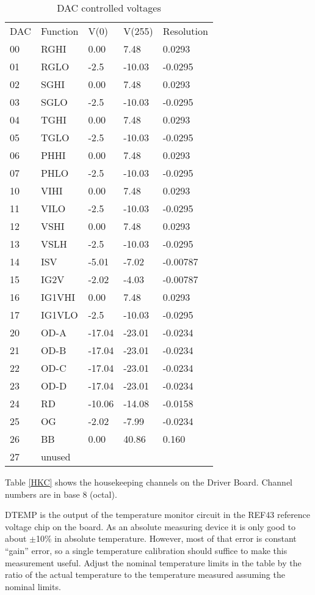 \documentclass[a4paper,12pt]{article}
\begin{document}
\begin{table}[h]
\centering
\begin{tabular}{|l|l|l|l|l|}
\hline
DAC & Function & V(0) & V(255) & Resolution \\
00 & RGHI & 0.00 & 7.48 & 0.0293 \\
01 & RGLO & -2.5 & -10.03 & -0.0295 \\
02 & SGHI & 0.00 & 7.48 & 0.0293 \\
03 & SGLO & -2.5 & -10.03 & -0.0295 \\
04 & TGHI & 0.00 & 7.48 & 0.0293 \\
05 & TGLO & -2.5 & -10.03 & -0.0295 \\
06 & PHHI & 0.00 & 7.48 & 0.0293 \\
07 & PHLO & -2.5 & -10.03 & -0.0295 \\
10 & VIHI & 0.00 & 7.48 & 0.0293 \\
11 & VILO & -2.5 & -10.03 & -0.0295 \\
12 & VSHI & 0.00 & 7.48 & 0.0293 \\
13 & VSLH & -2.5 & -10.03 & -0.0295 \\
14 & ISV & -5.01 & -7.02 & -0.00787 \\
15 & IG2V & -2.02 & -4.03 & -0.00787 \\
16 & IG1VHI & 0.00 & 7.48 & 0.0293 \\
17 & IG1VLO & -2.5 & -10.03 & -0.0295 \\
20 & OD-A & -17.04 & -23.01 & -0.0234 \\
21 & OD-B & -17.04 & -23.01 & -0.0234 \\
22 & OD-C & -17.04 & -23.01 & -0.0234 \\
23 & OD-D & -17.04 & -23.01 & -0.0234 \\
24 & RD & -10.06 & -14.08 & -0.0158 \\
25 & OG & -2.02 & -7.99 & -0.0234 \\
26 & BB & 0.00 & 40.86 & 0.160 \\
27 & unused & & & \\
\hline
\end{tabular}
\caption{DAC controlled voltages}
\label{DACV}
\end{table}

Table \ref{HKC} shows the housekeeping channels on the Driver Board. Channel numbers are in base 8 (octal). 

DTEMP is the output of the temperature monitor circuit in the REF43 reference voltage chip on the board. As an absolute measuring device it is only good to about $\pm$10\% in absolute temperature. However, most of that error is constant ``gain'' error, so a single temperature calibration should suffice to make this measurement useful. Adjust the nominal temperature limits in the table by the ratio of the actual temperature to the temperature measured assuming the nominal limits.
\end{document}
